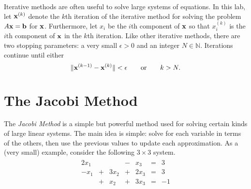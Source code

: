 \label{lab:iter_methods}



Iterative methods are often useful to solve large systems of equations.
In this lab, let $\mathbf{x}^{(k)}$ denote the $k$th iteration of the iterative method for solving the problem $A\mathbf{x}=\mathbf{b}$ for $\mathbf{x}$.
Furthermore, let $x_{i}$ be the $i$th component of $\mathbf{x}$ so that $x_{i}^{(k)}$ is the $i$th component of $\mathbf{x}$ in the $k$th iteration.
Like other iterative methods, there are two stopping parameters: a very small $\epsilon > 0$ and an integer $N\in\mathbb{N}$.
Iterations continue until either
\begin{equation} %
\|\x^{(k-1)}-\x^{(k)}\| < \epsilon
\qquad \text{or} \qquad
k > N.
\label{stopping-criteria}
\end{equation}

\section*{The Jacobi Method} %

The \emph{Jacobi Method} is a simple but powerful method used for solving certain kinds of large linear systems.
The main idea is simple: solve for each variable in terms of the others, then use the previous values to update each approximation.
As a (very small) example, consider the following $3 \times 3$ system.
\begin{align*}
\begin{array}{ccccccr}
  2x_1 &   &      & - & x_3  & = & 3  \\
  -x_1 & + & 3x_2 & + & 2x_3 & = & 3  \\
       & + & x_2  & + & 3x_3 & = & -1 \\
\end{array}
\end{align*}

